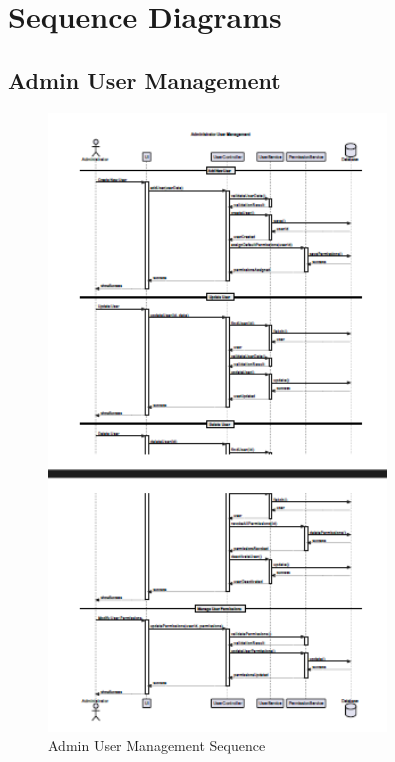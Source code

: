 \documentclass[12pt,a4paper]{report}
\begin{document}
\chapter{Sequence Diagrams}
\section{Admin User Management}
\begin{figure}[htbp]
    \centering
    \includegraphics[width=0.8\textwidth]{admin-user-managment-sequence.png}
    \caption{Admin User Management Sequence}
    \label{fig:admin-user-managment-sequence}
\end{figure}
\end{document}
